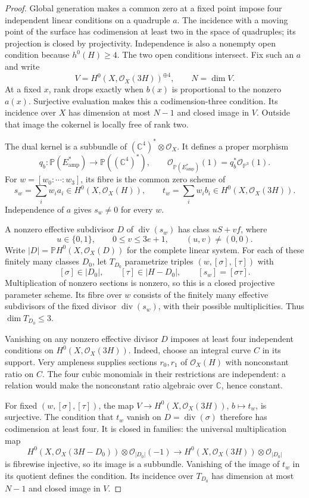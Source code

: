\begin{proof}
Global generation makes a common zero at a fixed point impose four independent linear conditions on a quadruple $a$. The incidence with a moving point of the surface has codimension at least two in the space of quadruples; its projection is closed by projectivity. Independence is also a nonempty open condition because $h^0(H)\geq4$. The two open conditions intersect. Fix such an $a$ and write
\[
 V=H^0(X,\mathcal O_X(3H))^{\oplus4},\qquad N=\dim V.
\]
At a fixed $x$, rank drops exactly when $b(x)$ is proportional to the nonzero $a(x)$. Surjective evaluation makes this a codimension-three condition. Its incidence over $X$ has dimension at most $N-1$ and closed image in $V$. Outside that image the cokernel is locally free of rank two.

The dual kernel is a subbundle of $(\mathbb C^4)^*\otimes\mathcal O_X$. It defines a proper morphism
\[
 q_b:\mathbb P(E_{\mathrm{amp}}^*)\longrightarrow
 \mathbb P((\mathbb C^4)^*),
 \qquad \mathcal O_{\mathbb P(E_{\mathrm{amp}}^*)}(1)
 =q_b^*\mathcal O_{\mathbb P^3}(1).
\]
For $w=[w_0:\cdots:w_3]$, its fibre is the common zero scheme of
\[
 s_w=\sum_iw_i a_i\in H^0(X,\mathcal O_X(H)),
 \qquad t_w=\sum_iw_i b_i\in H^0(X,\mathcal O_X(3H)).
\]
Independence of $a$ gives $s_w\neq0$ for every $w$.

A nonzero effective subdivisor $D$ of $\operatorname{div}(s_w)$ has class $uS+vf$, where
\[
 u\in\{0,1\},\qquad 0\leq v\leq3e+1,
 \qquad (u,v)\neq(0,0).
\]
Write $|D|=\mathbb P H^0(X,\mathcal O_X(D))$ for the complete linear system. For each of these finitely many classes $D_0$, let $T_{D_0}$ parametrize triples $(w,[\sigma],[\tau])$ with
\[
 [\sigma]\in|D_0|,\qquad [\tau]\in|H-D_0|,
 \qquad [s_w]=[\sigma\tau].
\]
Multiplication of nonzero sections is nonzero, so this is a closed projective parameter scheme. Its fibre over $w$ consists of the finitely many effective subdivisors of the fixed divisor $\operatorname{div}(s_w)$, with their possible multiplicities. Thus $\dim T_{D_0}\leq3$.

Vanishing on any nonzero effective divisor $D$ imposes at least four independent conditions on $H^0(X,\mathcal O_X(3H))$. Indeed, choose an integral curve $C$ in its support. Very ampleness supplies sections $r_0,r_1$ of $\mathcal O_X(H)$ with nonconstant ratio on $C$. The four cubic monomials in their restrictions are independent: a relation would make the nonconstant ratio algebraic over $\mathbb C$, hence constant.

For fixed $(w,[\sigma],[\tau])$, the map $V\to H^0(X,\mathcal O_X(3H))$, $b\mapsto t_w$, is surjective. The condition that $t_w$ vanish on $D=\operatorname{div}(\sigma)$ therefore has codimension at least four. It is closed in families: the universal multiplication map
\[
 H^0(X,\mathcal O_X(3H-D_0))\otimes\mathcal O_{|D_0|}(-1)
 \longrightarrow H^0(X,\mathcal O_X(3H))\otimes\mathcal O_{|D_0|}
\]
is fibrewise injective, so its image is a subbundle. Vanishing of the image of $t_w$ in its quotient defines the condition. Its incidence over $T_{D_0}$ has dimension at most $N-1$ and closed image in $V$.


\end{proof}
